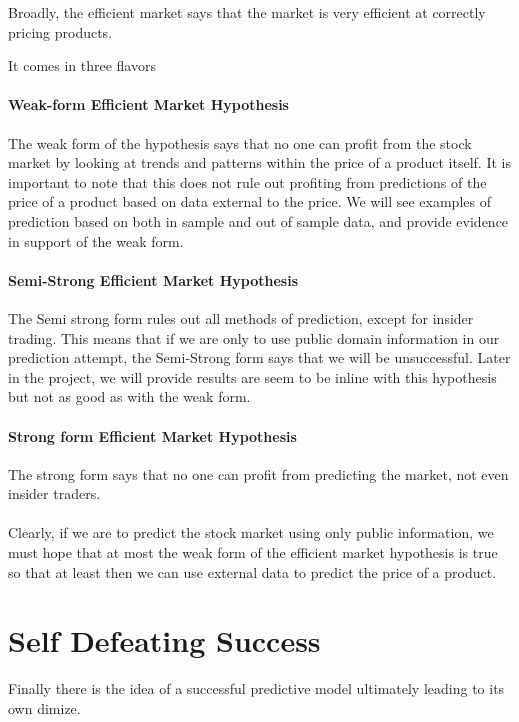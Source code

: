 \documentclass{report}
\begin{document}
Broadly, the efficient market says that the market is very efficient at correctly pricing products.

It comes in three flavors 

\paragraph{Weak-form Efficient Market Hypothesis}
The weak form of the hypothesis says that no one can profit from the stock market by looking at trends and patterns within the price of a product itself. It is important to note that this does not rule out profiting from predictions of the price of a product based on data external to the price. We will see examples of prediction based on both in sample and out of sample data, and provide evidence in support of the weak form.

\paragraph{Semi-Strong Efficient Market Hypothesis}
The Semi strong form rules out all methods of prediction, except for insider trading. This means that if we are only to use public domain information in our prediction attempt, the Semi-Strong form says that we will be unsuccessful. Later in the project, we will provide results are seem to be inline with this hypothesis but not as good as with the weak form.

\paragraph{Strong form Efficient Market Hypothesis}
The strong form says that no one can profit from predicting the market, not even insider traders.

\paragraph{}

Clearly, if we are to predict the stock market using only public information, we must hope that at most the weak form of the efficient market hypothesis is true so that at least then we can use external data to predict the price of a product.

\section{Self Defeating Success}

Finally there is the idea of a successful predictive model ultimately leading to its own dimize. 
\end{document}
